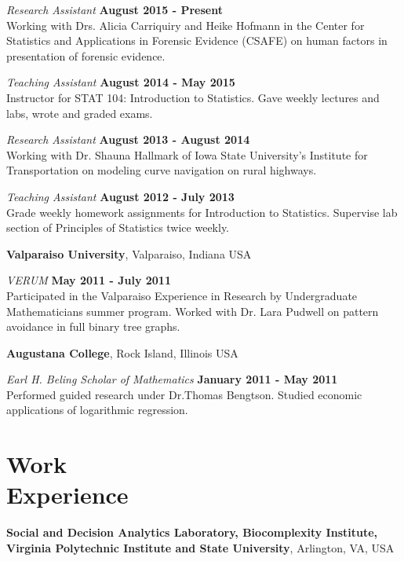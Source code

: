 \documentclass[margin,line]{res}
\begin{document}
\begin{resume}
{\em Research Assistant} \hfill {\bf August 2015 - Present}\\
Working with Drs. Alicia Carriquiry and Heike Hofmann in the Center for Statistics and Applications in Forensic Evidence (CSAFE) on human factors in presentation of forensic evidence.

{\em Teaching Assistant} \hfill {\bf August 2014 - May 2015}\\
Instructor for STAT 104: Introduction to Statistics. Gave weekly lectures and labs, wrote and graded exams.


{\em Research Assistant} \hfill {\bf August 2013 - August 2014}\\
Working with Dr. Shauna Hallmark of Iowa State University's Institute for Transportation on modeling curve navigation on rural highways. 

{\em Teaching Assistant} \hfill {\bf August 2012 - July 2013}\\
Grade weekly homework assignments for Introduction to Statistics. Supervise lab section of Principles of Statistics twice weekly.

{\bf Valparaiso University}, Valparaiso, Indiana USA

\vspace{-.3cm}
{\em VERUM} \hfill {\bf May 2011 - July 2011}\\
Participated in the Valparaiso Experience in Research by Undergraduate Mathematicians summer program. Worked with Dr. Lara Pudwell on pattern avoidance in full binary tree graphs.  
\clearpage

{\bf Augustana College}, Rock Island, Illinois USA

\vspace{-.3cm}
{\em Earl H. Beling Scholar of Mathematics} \hfill {\bf January 2011 - May 2011}\\
Performed guided research under Dr.Thomas Bengtson.  Studied economic applications of logarithmic regression.  

\section{\sc Work \\Experience}

{\bf Social and Decision Analytics Laboratory, Biocomplexity Institute, \\ Virginia Polytechnic Institute and State University}, Arlington, VA, USA


\end{resume}
\end{document}
